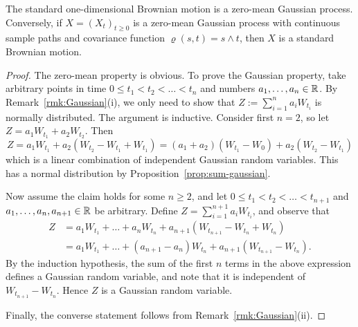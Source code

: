 \begin{proposition}
\label{prop:BM-gaussian}
    The standard one-dimensional Brownian motion is a zero-mean Gaussian process. Conversely, if $X=(X_t)_{t\ge 0}$ is a zero-mean Gaussian process with continuous sample paths and covariance function $\varrho(s,t)=s\wedge t$, then $X$ is a standard Brownian motion.
\end{proposition}

\begin{proof}
The zero-mean property is obvious. To prove the Gaussian property, take arbitrary points in time $0\le t_1 < t_2 < \ldots < t_n$ and numbers $a_1,\ldots, a_n \in \mathbb{R}$. By Remark~\ref{rmk:Gaussian}(i), we only need to show that $Z := \sum_{i=1}^n a_i W_{t_i}$ is normally distributed. The argument is inductive. Consider first $n=2$, so let $Z = a_1 W_{t_1} + a_2 W_{t_2}$. Then
\begin{equation*}
    Z = a_1 W_{t_1} + a_2(W_{t_2} - W_{t_1} + W_{t_1}) = (a_1+a_2)(W_{t_1}-W_0) + a_2(W_{t_2}-W_{t_1})
\end{equation*}
which is a linear combination of independent Gaussian random variables. This has a normal distribution by Proposition~\ref{prop:sum-gaussian}.

Now assume the claim holds for some $n \ge 2$, and let $0 \le t_1 < t_2 < \ldots < t_{n+1}$ and $a_1, \ldots, a_n, a_{n+1} \in \mathbb{R}$ be arbitrary. Define $Z = \sum_{i=1}^{n+1} a_i W_{t_i}$, and observe that
\begin{align*}
    Z &= a_1 W_{t_1} + \ldots + a_n W_{t_n} + a_{n+1}(W_{t_{n+1}} - W_{t_n} + W_{t_n}) \\
    &= a_1 W_{t_1} + \ldots + (a_{n+1}-a_n)W_{t_n} + a_{n+1}(W_{t_{n+1}} - W_{t_n}).
\end{align*}
By the induction hypothesis, the sum of the first $n$ terms in the above expression defines a Gaussian random variable, and note that it is independent of $W_{t_{n+1}}-W_{t_n}$. Hence $Z$ is a Gaussian random variable.

Finally, the converse statement follows from Remark~\ref{rmk:Gaussian}(ii).
\end{proof}

